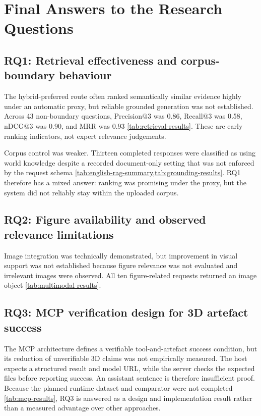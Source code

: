 \section{Final Answers to the Research Questions}
\label{sec:conclusion-rqs}

\subsection{RQ1: Retrieval effectiveness and corpus-boundary behaviour}
\label{sec:conclusion-rq1}

The hybrid-preferred route often ranked semantically similar evidence highly under an automatic proxy, but reliable grounded generation was not established. Across 43 non-boundary questions, Precision@3 was 0.86, Recall@3 was 0.58, nDCG@3 was 0.90, and MRR was 0.93 \cref{tab:retrieval-results}. These are early ranking indicators, not expert relevance judgements.

Corpus control was weaker. Thirteen completed responses were classified as using world knowledge despite a recorded document-only setting that was not enforced by the request schema \cref{tab:english-rag-summary,tab:grounding-results}. RQ1 therefore has a mixed answer: ranking was promising under the proxy, but the system did not reliably stay within the uploaded corpus.

\subsection{RQ2: Figure availability and observed relevance limitations}
\label{sec:conclusion-rq2}

Image integration was technically demonstrated, but improvement in visual support was not established because figure relevance was not evaluated and irrelevant images were observed. All ten figure-related requests returned an image object \cref{tab:multimodal-results}.

\subsection{RQ3: MCP verification design for 3D artefact success}
\label{sec:conclusion-rq3}

The MCP architecture defines a verifiable tool-and-artefact success condition, but its reduction of unverifiable 3D claims was not empirically measured. The host expects a structured result and model URL, while the server checks the expected files before reporting success. An assistant sentence is therefore insufficient proof. Because the planned runtime dataset and comparator were not completed \cref{tab:mcp-results}, RQ3 is answered as a design and implementation result rather than a measured advantage over other approaches.

